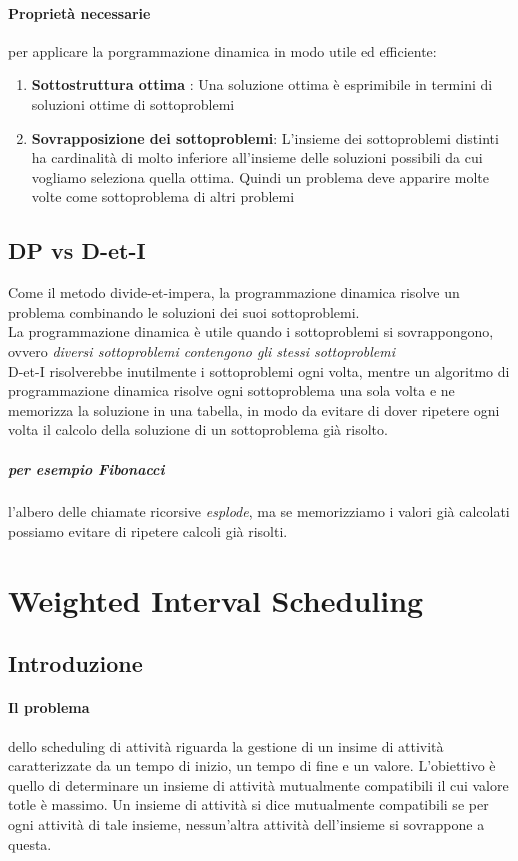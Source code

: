 \documentclass[12pt, a4paper, openany]{book}
\begin{document}
\paragraph{Proprietà necessarie} per applicare la porgrammazione dinamica in modo utile ed efficiente:
\begin{enumerate}
	\item \textbf{Sottostruttura ottima} : Una soluzione ottima è esprimibile in termini di soluzioni ottime di sottoproblemi
	\item \textbf{Sovrapposizione dei sottoproblemi}: L'insieme dei sottoproblemi distinti ha cardinalità di molto inferiore all'insieme delle soluzioni possibili da cui vogliamo seleziona quella ottima. Quindi un problema deve apparire molte volte come sottoproblema di altri problemi
\end{enumerate}

\subsection{DP vs D-et-I}
Come il metodo divide-et-impera, la programmazione dinamica risolve un problema combinando le soluzioni dei suoi sottoproblemi.
\\La programmazione dinamica è utile quando i sottoproblemi si sovrappongono, ovvero \emph{diversi sottoproblemi contengono gli stessi sottoproblemi}\\
D-et-I risolverebbe inutilmente i sottoproblemi ogni volta, mentre un algoritmo di programmazione dinamica risolve ogni sottoproblema una sola volta e ne memorizza la soluzione in una tabella, in modo da evitare di dover ripetere ogni volta il calcolo della soluzione di un sottoproblema già risolto.
\subparagraph{per esempio Fibonacci} l'albero delle chiamate ricorsive \emph{esplode}, ma se memorizziamo i valori già calcolati possiamo evitare di ripetere calcoli già risolti.

\section{Weighted Interval Scheduling}
\subsection{Introduzione}
\paragraph{Il problema} dello scheduling di attività riguarda la gestione di un insime di attività caratterizzate da un tempo di inizio, un tempo di fine e un valore. L'obiettivo è quello di determinare un insieme di attività mutualmente compatibili il cui valore totle è massimo. Un insieme di attività si dice mutualmente compatibili se per ogni attività di tale insieme, nessun'altra attività dell'insieme si sovrappone a questa.
\end{document}
